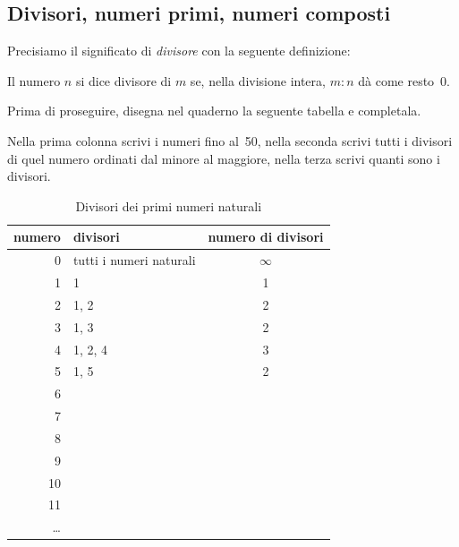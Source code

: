 
\subsection{Divisori, numeri primi, numeri composti}

Precisiamo il significato di \emph{divisore} con la seguente definizione:

\begin{definizione}
 Il numero $n$ si dice divisore di $m$ se, nella divisione intera, 
 $m : n$ dà come resto~0.
\end{definizione}

Prima di proseguire, disegna nel quaderno la seguente tabella e completala. 
 
Nella prima colonna scrivi i numeri fino al~50, nella seconda scrivi tutti 
i divisori di quel numero ordinati dal minore al maggiore, nella terza 
scrivi quanti sono i divisori.

\begin{table}[h]
\centering
\caption{Divisori dei primi numeri naturali}
\begin{tabular}{|r|p{6cm}|c|}
\hline
\textsf{\relax 
numero
} & \textsf{\relax 
          divisori          
} & \textsf{\relax 
numero di divisori
}\\
\hline
0 & tutti i numeri naturali & $\infty$\\
\hline
1 & 1 & 1\\
\hline
2 & 1, 2 & 2\\
\hline
3 & 1, 3 & 2\\
\hline
4 & 1, 2, 4 & 3\\
\hline
5 & 1, 5 & 2\\
\hline
6 &  & \\
\hline
7 &  & \\
\hline
8 &  & \\
\hline
9 &  & \\
\hline
10 &  & \\
\hline
11 &  & \\
\hline
\dots &  & \\
\hline
\end{tabular}
\end{table}

